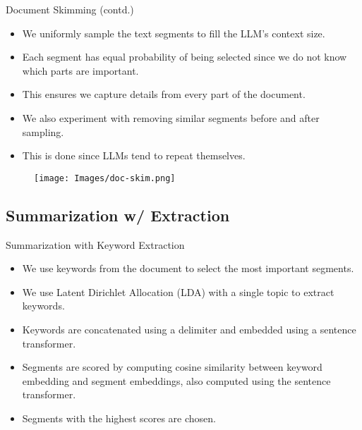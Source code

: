 		\begin{frame}{Document Skimming (contd.)}

			\begin{itemize}
				\item We uniformly sample the text segments to fill the LLM's context size.
				\item Each segment has equal probability of being selected since we do not know
				which parts are important.
				\item This ensures we capture details from every part of the document.
				\item We also experiment with removing similar segments before and after sampling.
				\item This is done since LLMs tend to repeat themselves.
			\end{itemize}

			\begin{figure}
				\centering
				\texttt{[image: Images/doc-skim.png]}
			\end{figure}

		\end{frame}


	\subsection{Summarization w/ Extraction}

		\begin{frame}{Summarization with Keyword Extraction}

			\begin{itemize}
				\item We use keywords from the document to select the most important segments.
				\item We use Latent Dirichlet Allocation (LDA) \citep{blei2003latent} with
				a single topic to extract keywords.
				\item Keywords are concatenated using a delimiter and embedded using a
				sentence transformer.
				\item Segments are scored by computing cosine similarity between keyword embedding
				and segment embeddings, also computed using the sentence transformer.
				\item Segments with the highest scores are chosen.
			\end{itemize}

		\end{frame}
